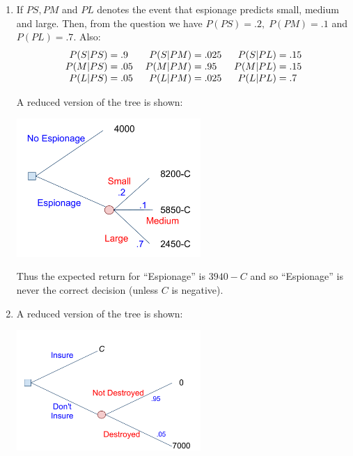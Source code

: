 \documentclass[12pt]{article}
\begin{document}
\begin{enumerate}
\item If $PS,PM$ and $PL$ denotes the event that espionage predicts small, medium and large. Then, from the question we have $P(PS)=.2,\;P(PM)=.1$ and $P(PL)=.7$. Also:
$$\begin{array}{c@{\;}c@{\;}c}
\begin{array}{r@{\;}c@{\;}l}
P(S|PS)&=&.9\\
P(M|PS)&=&.05\\
P(L|PS)&=&.05
\end{array}
&
\begin{array}{r@{\;}c@{\;}l}
P(S|PM)&=&.025\\
P(M|PM)&=&.95\\
P(L|PM)&=&.025
\end{array}
&
\begin{array}{r@{\;}c@{\;}l}
P(S|PL)&=&.15\\
P(M|PL)&=&.15\\
P(L|PL)&=&.7
\end{array}
\end{array}$$

A reduced version of the tree is shown:
\begin{center}
\includegraphics[width=7cm]{Espionage_Diagram.pdf}
\end{center}


Thus the expected return for ``Espionage'' is $3940-C$ and so ``Espionage'' is never the correct decision (unless $C$ is negative).

\item A reduced version of the tree is shown:

\begin{center}
\includegraphics[width=7cm]{Insurance_Example.pdf}
\end{center}


\end{enumerate}
\end{document}
